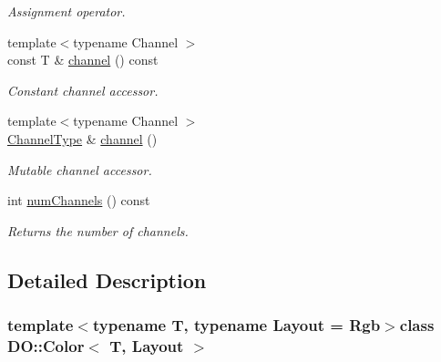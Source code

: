\begin{DoxyCompactItemize}
\begin{DoxyCompactList}\small\item\em Assignment operator. \end{DoxyCompactList}\item 
\hypertarget{class_d_o_1_1_color_af4923830e61e808a81501dc9344bc731}{{\footnotesize template$<$typename Channel $>$ }\\const T \& \hyperlink{class_d_o_1_1_color_af4923830e61e808a81501dc9344bc731}{channel} () const }\label{class_d_o_1_1_color_af4923830e61e808a81501dc9344bc731}

\begin{DoxyCompactList}\small\item\em Constant channel accessor. \end{DoxyCompactList}\item 
\hypertarget{class_d_o_1_1_color_a0b6849e95fe39fc5321a33ca630fd5df}{{\footnotesize template$<$typename Channel $>$ }\\\hyperlink{class_d_o_1_1_color_a4fc05512d90a4b0e4d7a6ca6e56b9ed4}{Channel\-Type} \& \hyperlink{class_d_o_1_1_color_a0b6849e95fe39fc5321a33ca630fd5df}{channel} ()}\label{class_d_o_1_1_color_a0b6849e95fe39fc5321a33ca630fd5df}

\begin{DoxyCompactList}\small\item\em Mutable channel accessor. \end{DoxyCompactList}\item 
\hypertarget{class_d_o_1_1_color_aa025989b00244ede2f541d9c79a36724}{int \hyperlink{class_d_o_1_1_color_aa025989b00244ede2f541d9c79a36724}{num\-Channels} () const }\label{class_d_o_1_1_color_aa025989b00244ede2f541d9c79a36724}

\begin{DoxyCompactList}\small\item\em Returns the number of channels. \end{DoxyCompactList}\end{DoxyCompactItemize}


\subsection{Detailed Description}
\subsubsection*{template$<$typename T, typename Layout = Rgb$>$class D\-O\-::\-Color$<$ T, Layout $>$}

